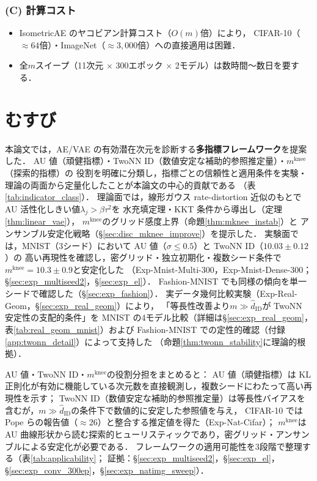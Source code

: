 \documentclass[11pt,a4paper]{jsarticle}
\newcommand{\mknee}{m^{\mathrm{knee}}}
\begin{document}
\subsubsection*{(C) 計算コスト}

\begin{itemize}
  \item IsometricAE のヤコビアン計算コスト（$O(m)$倍）により，
        CIFAR-10（$\approx 64$倍）・ImageNet（$\approx 3{,}000$倍）への直接適用は困難．
  \item 全$m$スイープ（11次元 $\times$ 300エポック $\times$ 2モデル）は数時間〜数日を要する．
\end{itemize}

\section{むすび}\label{sec:conclusion}

本論文では，AE/VAE の有効潜在次元を診断する\textbf{多指標フレームワーク}を提案した．
AU 値（頑健指標）・TwoNN ID（数値安定な補助的参照推定量）・$\mknee$（探索的指標）の
役割を明確に分類し，指標ごとの信頼性と適用条件を実験・理論の両面から定量化したことが本論文の中心的貢献である
（表\ref{tab:indicator_class}）．
理論面では，線形ガウス rate-distortion 近似のもとで AU 活性化しきい値$\lambda_j > \beta\tau^2$を
水充填定理・KKT 条件から導出し（定理\ref{thm:linear_vae}），
$\mknee$のグリッド感度上界（命題\ref{thm:mknee_instab}）と
アンサンブル安定化戦略（§\ref{sec:disc_mknee_improve}）を提示した．
実験面では，MNIST（3シード）において AU 値（$\sigma \leq 0.5$）と TwoNN ID（$10.03 \pm 0.12$）の
高い再現性を確認し，密グリッド・独立初期化・複数シード条件で$\mknee = 10.3 \pm 0.9$と安定化した
（Exp-Mnist-Multi-300，Exp-Mnist-Dense-300；§\ref{sec:exp_multiseed2}，§\ref{sec:exp_el}）．
Fashion-MNIST でも同様の傾向を単一シードで確認した（§\ref{sec:exp_fashion}）．
実データ幾何比較実験（Exp-Real-Geom，§\ref{sec:exp_real_geom}）により，
「等長性改善より$m \gg \hat{d}_\mathrm{ID}$が TwoNN 安定性の支配的条件」を
MNIST の4モデル比較（詳細は§\ref{sec:exp_real_geom}，表\ref{tab:real_geom_mnist}）および
Fashion-MNIST での定性的確認（付録\ref{app:twonn_detail}）によって支持した
（命題\ref{thm:twonn_stability}に理論的根拠）．

AU 値・TwoNN ID・$\mknee$の役割分担をまとめると：
AU 値（頑健指標）は KL 正則化が有効に機能している次元数を直接観測し，複数シードにわたって高い再現性を示す；
TwoNN ID（数値安定な補助的参照推定量）は等長性バイアスを含むが，$m \gg \hat{d}_\mathrm{ID}$の条件下で数値的に安定した参照値を与え，
CIFAR-10 では Pope ら\cite{pope2021intrinsic}の報告値（$\approx 26$）と整合する推定値を得た（Exp-Nat-Cifar）；
$\mknee$は AU 曲線形状から読む探索的ヒューリスティックであり，密グリッド・アンサンブルによる安定化が必要である．
フレームワークの適用可能性を3段階で整理する（表\ref{tab:applicability}；
証拠：§\ref{sec:exp_multiseed2}，§\ref{sec:exp_el}，§\ref{sec:exp_conv_300ep}，§\ref{sec:exp_natimg_sweep}）．
\end{document}
